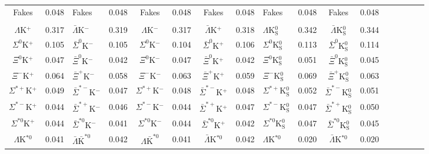 \documentclass[../AnalysisNoteJBuxton.tex]{subfiles}
\begin{document}
\begin{landscape}
\begin{table}[htbp]
{\begin{tabular}{|c|cV{5.0}c|cV{5.0}c|cV{5.0}c|cV{5.0}c|cV{5.0}c|c|}
  Fakes & 0.048 & Fakes & 0.048 & Fakes & 0.048 & Fakes & 0.048 & Fakes & 0.048 & Fakes & 0.048 \\
  
   \\
  $\Lambda$K$^{+}$ & 0.317 & $\bar{\Lambda}$K$^{-}$ & 0.319 & $\Lambda$K$^{-}$ & 0.317 & $\bar{\Lambda}$K$^{+}$ & 0.318 & $\Lambda$K$^{0}_{\mathrm{S}}$ & 0.342 & $\bar{\Lambda}$K$^{0}_{\mathrm{S}}$ & 0.344 \\
  
  $\Sigma^{0}$K$^{+}$ & 0.105 & $\bar{\Sigma}^{0}$K$^{-}$ & 0.105 & $\Sigma^{0}$K$^{-}$ & 0.104 & $\bar{\Sigma}^{0}$K$^{+}$ & 0.106 & $\Sigma^{0}$K$^{0}_{\mathrm{S}}$ & 0.113 & $\bar{\Sigma}^{0}$K$^{0}_{\mathrm{S}}$ & 0.114 \\
  
  $\Xi^{0}$K$^{+}$ & 0.047 & $\bar{\Xi}^{0}$K$^{-}$ & 0.042 & $\Xi^{0}$K$^{-}$ & 0.047 & $\bar{\Xi}^{0}$K$^{+}$ & 0.042 & $\Xi^{0}$K$^{0}_{\mathrm{S}}$ & 0.051 & $\bar{\Xi}^{0}$K$^{0}_{\mathrm{S}}$ & 0.045 \\
  
  $\Xi^{-}$K$^{+}$ & 0.064 & $\bar{\Xi}^{+}$K$^{-}$ & 0.058 & $\Xi^{-}$K$^{-}$ & 0.063 & $\bar{\Xi}^{+}$K$^{+}$ & 0.059 & $\Xi^{-}$K$^{0}_{\mathrm{S}}$ & 0.069 & $\bar{\Xi}^{+}$K$^{0}_{\mathrm{S}}$ & 0.063 \\
  
  $\Sigma^{*+}$K$^{+}$ & 0.049 & $\bar{\Sigma}^{*-}$K$^{-}$ & 0.047 & $\Sigma^{*+}$K$^{-}$ & 0.048 & $\bar{\Sigma}^{*-}$K$^{+}$ & 0.048 & $\Sigma^{*+}$K$^{0}_{\mathrm{S}}$ & 0.052 & $\bar{\Sigma}^{*-}$K$^{0}_{\mathrm{S}}$ & 0.051 \\
  
  $\Sigma^{*-}$K$^{+}$ & 0.044 & $\bar{\Sigma}^{*+}$K$^{-}$ & 0.046 & $\Sigma^{*-}$K$^{-}$ & 0.044 & $\bar{\Sigma}^{*+}$K$^{+}$ & 0.047 & $\Sigma^{*-}$K$^{0}_{\mathrm{S}}$ & 0.047 & $\bar{\Sigma}^{*+}$K$^{0}_{\mathrm{S}}$ & 0.050 \\
  
  $\Sigma^{*0}$K$^{+}$ & 0.044 & $\bar{\Sigma}^{*0}$K$^{-}$ & 0.041 & $\Sigma^{*0}$K$^{-}$ & 0.044 & $\bar{\Sigma}^{*0}$K$^{+}$ & 0.042 & $\Sigma^{*0}$K$^{0}_{\mathrm{S}}$ & 0.047 & $\bar{\Sigma}^{*0}$K$^{0}_{\mathrm{S}}$ & 0.045 \\
  
  $\Lambda$K$^{*0}$ & 0.041 & $\bar{\Lambda}\bar{\mathrm{K}}^{*0}$ & 0.042 & $\Lambda\bar{\mathrm{K}}^{*0}$ & 0.041 & $\bar{\Lambda}$K$^{*0}$ & 0.042 & $\Lambda$K$^{*0}$ & 0.020 & $\bar{\Lambda}$K$^{*0}$ & 0.020 \\
  

\end{tabular}}
\end{table}
\end{landscape}
\end{document}
